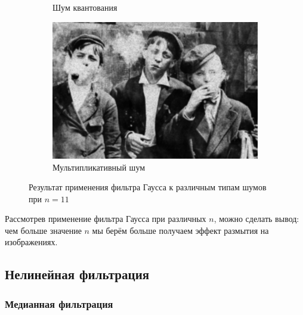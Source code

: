 \begin{figure}[ht!]
\begin{subfigure}[b]{0.5\linewidth}
      \caption{Шум квантования} 
      \label{gaussian_11:e}
    \end{subfigure}%
    \begin{subfigure}[b]{0.5\linewidth}
        \centering
        \includegraphics[width=0.95\linewidth]{../Gaussian_Blur/Gaussian_Blur_Speckle_noise_(11,11).jpg} 
        \caption{Мультипликативный шум} 
        \label{gaussian_11:f} 
    \end{subfigure} 
    \caption{Результат применения фильтра Гаусса к различным типам шумов при $n = 11$}
    \label{img:gaussian_11} 
\end{figure}
  \FloatBarrier

Рассмотрев применение фильтра Гаусса при различных $n$, можно сделать вывод: чем больше значение $n$ мы берём больше получаем эффект размытия на изображениях.

\subsection{Нелинейная фильтрация}

\subsubsection{Медианная фильтрация}

